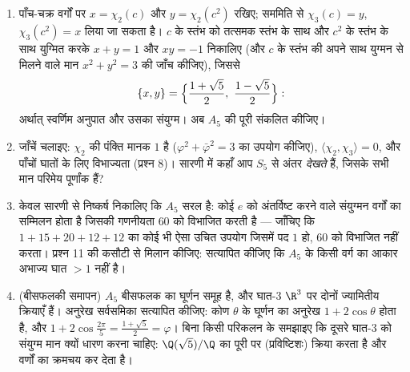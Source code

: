 \begin{problem}[{सप्ताहांत समस्या --- क्रम $p^aq^b$ के समूहों की
विलेयता}]
\begin{enumerate}[resume]
        निर्धारित कर देती है: दर्शाइए कि द्विक स्थानांतरणों पर
        $\chi_2(g) = \chi_3(g) = -1$ और त्रि-चक्रों पर $0$।
  \item पाँच-चक्र वर्गों पर $x = \chi_2(c)$ और $y =
        \chi_2(c^2)$ रखिए; सममिति से
        $\chi_3(c) = y$, $\chi_3(c^2) = x$ लिया जा सकता है। $c$ के स्तंभ को तत्समक
        स्तंभ के साथ और $c^2$ के स्तंभ के साथ युग्मित करके $x + y = 1$
        और $xy = -1$ निकालिए (और $c$ के स्तंभ की अपने साथ युग्मन से
        मिलने वाले मान $x^2 +
        y^2 = 3$ की जाँच कीजिए), जिससे
        \[
        \{x, y\} = \Bigl\{\frac{1 + \sqrt5}2,\ \frac{1 -
        \sqrt5}2\Bigr\} :
        \]
        अर्थात् स्वर्णिम अनुपात और उसका संयुग्म। अब $A_5$ की पूरी
         संकलित कीजिए।
  \item जाँचें चलाइए: $\chi_2$ की पंक्ति मानक $1$ है ($\varphi^2 + \bar\varphi^2 = 3$ का
        उपयोग कीजिए), $\langle\chi_2,
        \chi_3\rangle = 0$, और पाँचों घातों के लिए 
        विभाज्यता (प्रश्न 8)। सारणी में कहाँ आप $S_5$ से अंतर
        \emph{देखते} हैं, जिसके सभी  मान परिमेय पूर्णांक हैं?
  \item केवल सारणी से निष्कर्ष निकालिए कि $A_5$ सरल है: कोई
         $e$ को अंतर्विष्ट करने वाले संयुग्मन
        वर्गों का सम्मिलन होता है जिसकी गणनीयता $60$ को विभाजित
        करती है --- जाँचिए कि $1 + 15 + 20 + 12 + 12$ का कोई भी ऐसा उचित उपयोग जिसमें
        पद $1$ हो, $60$ को विभाजित नहीं करता। प्रश्न 11 की
        कसौटी से मिलान कीजिए: सत्यापित कीजिए कि $A_5$ के किसी वर्ग
        का आकार अभाज्य घात $> 1$ नहीं है।
  \item (बीसफलकी समापन) $A_5$ बीसफलक का घूर्णन समूह है, और घात-$3$
         $\R^3$ पर दोनों ज्यामितीय क्रियाएँ हैं। अनुरेख
        सर्वसमिका सत्यापित कीजिए: कोण $\theta$ के घूर्णन का अनुरेख
        $1 +
        2\cos\theta$ होता है, और $1 + 2\cos\frac{2\pi}5 =
        \frac{1+\sqrt5}2 = \varphi$। बिना किसी परिकलन के समझाइए कि
        दूसरे घात-$3$  को संयुग्म मान क्यों धारण करना चाहिए:
        $\Q(\sqrt5)/\Q$ का  पूरी  पर (प्रविष्टिशः)
        क्रिया करता है और  वर्णों का क्रमचय कर देता है।
\end{enumerate}


\end{problem}
